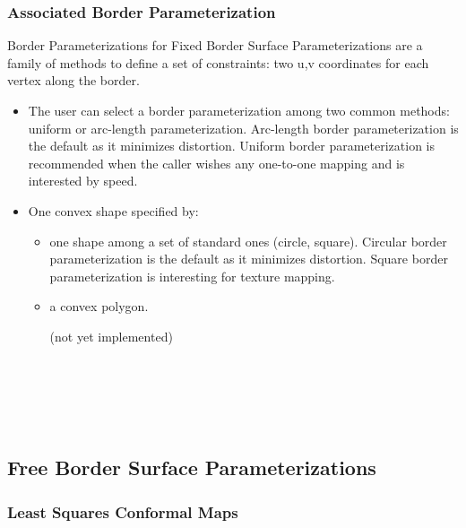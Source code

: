 \subsubsection{Associated Border Parameterization}

Border Parameterizations for Fixed Border Surface Parameterizations
are a family of methods to define a
set of constraints: two u,v coordinates for each vertex along the border.

\begin{itemize}

\item The user can select a border parameterization among
two common methods: uniform or arc-length parameterization.
Arc-length border parameterization is the default as it minimizes distortion.
Uniform border parameterization is recommended when the caller wishes
any one-to-one mapping and is interested by speed.

\item One convex shape specified by:

    \begin{itemize}

    \item one shape among a set of standard ones (circle, square).
    Circular border parameterization is the default as it minimizes distortion.
    Square border parameterization is interesting for texture mapping.

    \item a convex polygon.

    (not yet implemented)

    \end{itemize}

\end{itemize}

  \\
  \\
  \\
  \\


\subsection{Free Border Surface Parameterizations}

\subsubsection{Least Squares Conformal Maps}

